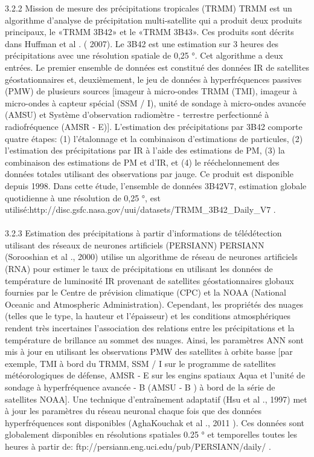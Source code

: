 3.2.2 Mission de mesure des précipitations tropicales (TRMM)
TRMM est un algorithme d'analyse de précipitation multi-satellite qui a produit deux produits principaux, le «TRMM 3B42» et le «TRMM 3B43». Ces produits sont décrits dans Huffman et al . ( 2007). Le 3B42 est une estimation sur 3 heures des précipitations avec une résolution spatiale de 0,25 °. Cet algorithme a deux entrées. Le premier ensemble de données est constitué des données IR de satellites géostationnaires et, deuxièmement, le jeu de données à hyperfréquences passives (PMW) de plusieurs sources [imageur à micro-ondes TRMM (TMI), imageur à micro-ondes à capteur spécial (SSM / I), unité de sondage à micro-ondes avancée (AMSU) et Système d'observation radiomètre ‐ terrestre perfectionné à radiofréquence (AMSR ‐ E)]. L’estimation des précipitations par 3B42 comporte quatre étapes: (1) l’étalonnage et la combinaison d’estimations de particules, (2) l’estimation des précipitations par IR à l’aide des estimations de PM, (3) la combinaison des estimations de PM et d’IR, et (4) le rééchelonnement des données totales utilisant des observations par jauge. Ce produit est disponible depuis 1998. Dans cette étude, l'ensemble de données 3B42V7, estimation globale quotidienne à une résolution de 0,25 °, est utilisé:http://disc.gsfc.nasa.gov/uui/datasets/TRMM_3B42_Daily_V7 .\\ \ \\
3.2.3 Estimation des précipitations à partir d'informations de télédétection utilisant des réseaux de neurones artificiels (PERSIANN)
PERSIANN (Sorooshian et al ., 2000) utilise un algorithme de réseau de neurones artificiels (RNA) pour estimer le taux de précipitations en utilisant les données de température de luminosité IR provenant de satellites géostationnaires globaux fournies par le Centre de prévision climatique (CPC) et la NOAA (National Oceanic and Atmospheric Administration). Cependant, les propriétés des nuages ​​(telles que le type, la hauteur et l'épaisseur) et les conditions atmosphériques rendent très incertaines l'association des relations entre les précipitations et la température de brillance au sommet des nuages. Ainsi, les paramètres ANN sont mis à jour en utilisant les observations PMW des satellites à orbite basse [par exemple, TMI à bord du TRMM, SSM / I sur le programme de satellites météorologiques de défense, AMSR ‐ E sur les engins spatiaux Aqua et l'unité de sondage à hyperfréquence avancée ‐ B (AMSU ‐ B ) à bord de la série de satellites NOAA]. Une technique d’entraînement adaptatif (Hsu et al ., 1997) met à jour les paramètres du réseau neuronal chaque fois que des données hyperfréquences sont disponibles (AghaKouchak et al ., 2011 ). Ces données sont globalement disponibles en résolutions spatiales 0.25 ° et temporelles toutes les heures à partir de: ftp://persiann.eng.uci.edu/pub/PERSIANN/daily/ .\\ \ \\
